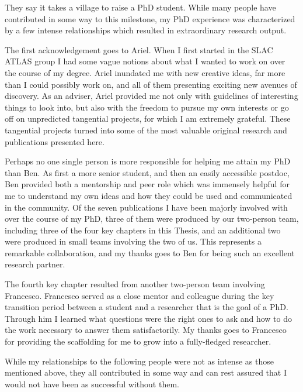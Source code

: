 They say it takes a village to raise a PhD student.
While many people have contributed in some way to this milestone, my PhD experience was characterized by a few intense relationships which resulted in extraordinary research output.

The first acknowledgement goes to Ariel.
When I first started in the SLAC ATLAS group I had some vague notions about what I wanted to work on over the course of my degree.
Ariel inundated me with new creative ideas, far more than I could possibly work on, and all of them presenting exciting new avenues of discovery.
As an adviser, Ariel provided me not only with guidelines of interesting things to look into, but also with the freedom to pursue my own interests or go off on unpredicted tangential projects, for which I am extremely grateful.
These tangential projects turned into some of the most valuable original research and publications presented here.

Perhaps no one single person is more responsible for helping me attain my PhD than Ben.
As first a more senior student, and then an easily accessible postdoc, Ben provided both a mentorship and peer role which was immensely helpful for me to understand my own ideas and how they could be used and communicated in the community.
Of the seven publications I have been majorly involved with over the course of my PhD, three of them were produced by our two-person team, including three of the four key chapters in this Thesis, and an additional two were produced in small teams involving the two of us.
This represents a remarkable collaboration, and my thanks goes to Ben for being such an excellent research partner. 

The fourth key chapter resulted from another two-person team involving Francesco.
Francesco served as a close mentor and colleague during the key transition period between a student and a researcher that is the goal of a PhD.
Through him I learned what questions were the right ones to ask and how to do the work necessary to answer them satisfactorily.
My thanks goes to Francesco for providing the scaffolding for me to grow into a fully-fledged researcher.

While my relationships to the following people were not as intense as those mentioned above, they all contributed in some way and can rest assured that I would not have been as successful without them.

